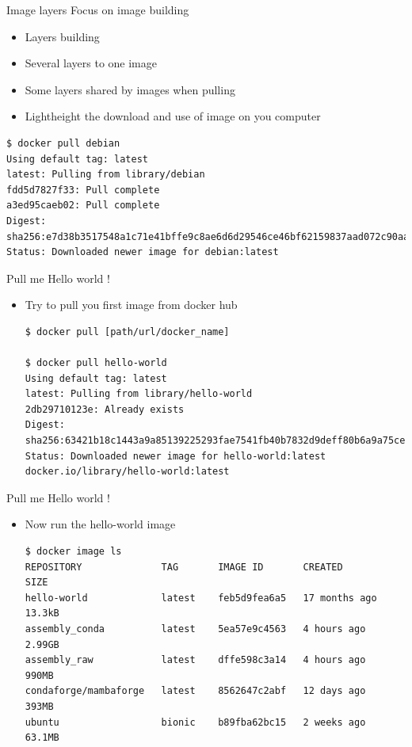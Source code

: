 \begin{frame}[fragile]{Image layers}
Focus on image building
\begin{itemize}
\item Layers building
\item Several layers to one image
\item Some layers shared by images when pulling
\item Lightheight the download and use of image on you computer
\end{itemize}
\begin{verbatim}
$ docker pull debian
Using default tag: latest
latest: Pulling from library/debian
fdd5d7827f33: Pull complete
a3ed95caeb02: Pull complete
Digest: sha256:e7d38b3517548a1c71e41bffe9c8ae6d6d29546ce46bf62159837aad072c90aa
Status: Downloaded newer image for debian:latest
\end{verbatim}
\end{frame}

\begin{frame}[fragile]{Pull me Hello world !}
\begin{itemize}
\item Try to pull you first image from docker hub
\begin{verbatim}
$ docker pull [path/url/docker_name]

$ docker pull hello-world
Using default tag: latest
latest: Pulling from library/hello-world
2db29710123e: Already exists 
Digest: sha256:63421b18c1443a9a85139225293fae7541fb40b7832d9deff80b6a9a75ce3604
Status: Downloaded newer image for hello-world:latest
docker.io/library/hello-world:latest

\end{verbatim}
\end{itemize}
\end{frame}

\begin{frame}[fragile]{Pull me Hello world !}
\begin{itemize}
\item Now run the hello-world image
\begin{verbatim}
$ docker image ls
REPOSITORY              TAG       IMAGE ID       CREATED         SIZE
hello-world             latest    feb5d9fea6a5   17 months ago   13.3kB
assembly_conda          latest    5ea57e9c4563   4 hours ago     2.99GB
assembly_raw            latest    dffe598c3a14   4 hours ago     990MB
condaforge/mambaforge   latest    8562647c2abf   12 days ago     393MB
ubuntu                  bionic    b89fba62bc15   2 weeks ago     63.1MB
\end{verbatim}
\end{itemize}
\end{frame}



